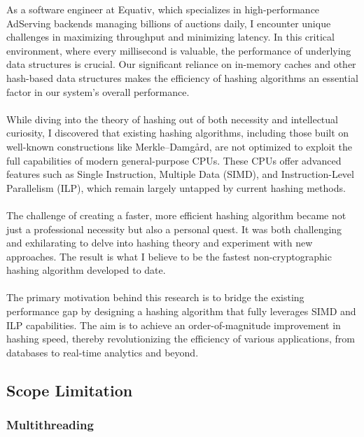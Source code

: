 \documentclass[10pt]{article}
\begin{document}
As a software engineer at Equativ, which specializes in high-performance AdServing backends managing billions of auctions daily, I encounter unique challenges in maximizing throughput and minimizing latency. In this critical environment, where every millisecond is valuable, the performance of underlying data structures is crucial. Our significant reliance on in-memory caches and other hash-based data structures makes the efficiency of hashing algorithms an essential factor in our system's overall performance.\\\\
While diving into the theory of hashing out of both necessity and intellectual curiosity, I discovered that existing hashing algorithms, including those built on well-known constructions like Merkle–Damgård, are not optimized to exploit the full capabilities of modern general-purpose CPUs.
These CPUs offer advanced features such as Single Instruction, Multiple Data (SIMD), and Instruction-Level Parallelism (ILP), which remain largely untapped by current hashing methods.\\\\
The challenge of creating a faster, more efficient hashing algorithm became not just a professional necessity but also a personal quest.
It was both challenging and exhilarating to delve into hashing theory and experiment with new approaches. The result is what I believe to be the fastest non-cryptographic hashing algorithm developed to date.\\\\
The primary motivation behind this research is to bridge the existing performance gap by designing a hashing algorithm that fully leverages SIMD and ILP capabilities. The aim is to achieve an order-of-magnitude improvement in hashing speed, thereby revolutionizing the efficiency of various applications, from databases to real-time analytics and beyond.

\subsection{Scope Limitation}

\subsubsection{Multithreading}
\end{document}
